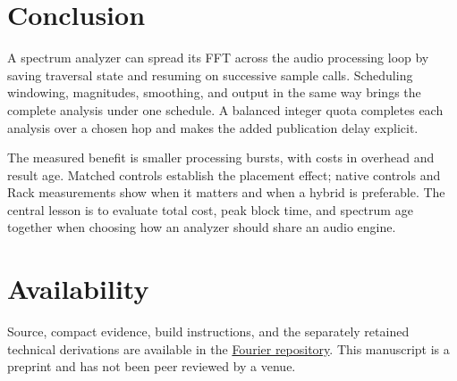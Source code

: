 \section{Conclusion}
A spectrum analyzer can spread its FFT across the audio processing loop by
saving traversal state and resuming on successive sample calls. Scheduling
windowing, magnitudes, smoothing, and output in the same way brings the
complete analysis under one schedule. A balanced integer quota completes
each analysis over a chosen hop and makes the added publication delay explicit.

The measured benefit is smaller processing bursts, with costs in overhead and
result age. Matched controls establish the placement effect; native controls
and Rack measurements show when it matters and when a hybrid is preferable.
The central lesson is to evaluate total cost, peak block time, and spectrum
age together when choosing how an analyzer should share an audio engine.

\section*{Availability}
Source, compact evidence, build instructions, and the separately retained
technical derivations are available in the
\href{https://github.com/Kautenja/ArhythmeticUnits-Fourier/tree/main/docs/whitepaper}{Fourier repository}.
This manuscript is a preprint and has not been peer reviewed by a venue.
